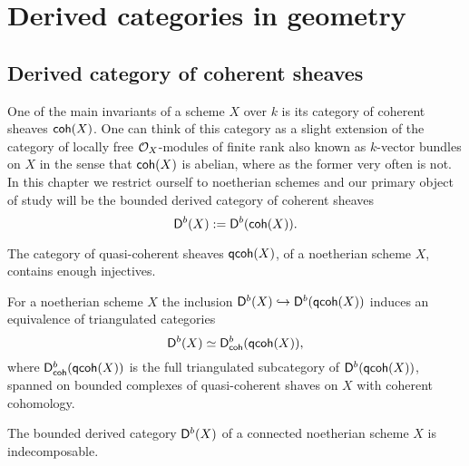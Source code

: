 \section{Derived categories in geometry}
\label{Derived categories in geometry}

\subsection{Derived category of coherent sheaves}

One of the main invariants of a scheme $X$ over $k$ is its category of coherent sheaves $\mathsf{coh}(X)$. One can think of this category as a slight extension of the category of locally free $\mathcal O_X$-modules of finite rank also known as $k$-vector bundles on $X$ in the sense that $\mathsf{coh}(X)$ is abelian, where as the former very often is not. In this chapter we restrict ourself to noetherian schemes and our primary object of study will be the bounded derived category of coherent sheaves
\[
    \mathsf{D}^b(X) := \mathsf{D}^b(\mathsf{coh}(X)).
\]

\begin{proposition}
    The category of quasi-coherent sheaves $\mathsf{qcoh}(X)$, of a noetherian scheme $X$, contains enough injectives.
\end{proposition}

\begin{proposition}
    For a noetherian scheme $X$ the inclusion $\mathsf{D}^b(X) \hookrightarrow \mathsf{D}^b(\mathsf{qcoh}(X))$ induces an equivalence of triangulated categories
    \[
        \mathsf{D}^b(X) \simeq \mathsf{D}^b_{\mathsf{coh}}(\mathsf{qcoh}(X)),
    \]
    where $\mathsf{D}^b_{\mathsf{coh}}(\mathsf{qcoh}(X))$ is the full triangulated subcategory of $\mathsf{D}^b(\mathsf{qcoh}(X))$, spanned on bounded complexes of quasi-coherent shaves on $X$ with coherent cohomology.
\end{proposition}

\begin{proposition}
    
\end{proposition}

\begin{theorem}\emph{\cite[Proposition 3.10]{huybrechts2006fouriermukai}}
    The bounded derived category $\mathsf{D}^b(X)$ of a connected noetherian scheme $X$ is indecomposable.
\end{theorem}

\newpage

